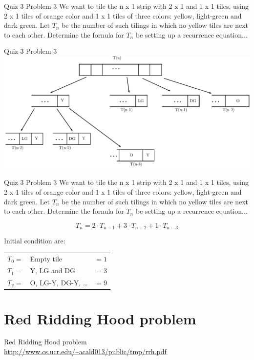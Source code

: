 \documentclass{beamer}
\begin{document}
\begin{frame}{Quiz 3 Problem 3}
We want to tile the n x 1 strip with 2 x 1 and 1 x 1 tiles, using 2 x 1 tiles of orange color and 1 x 1 tiles of three colors: yellow, light-green and dark green.  Let $T_n$ be the number of such tilings in which no yellow tiles are next to each other.  Determine the fornula for $T_n$ be setting up a recurrence equation...
\end{frame}

\begin{frame}{Quiz 3 Problem 3}
    \centering
    \includegraphics[width=1\linewidth]{tiling}
\end{frame}

\begin{frame}{Quiz 3 Problem 3}
We want to tile the n x 1 strip with 2 x 1 and 1 x 1 tiles, using 2 x 1 tiles of orange color and 1 x 1 tiles of three colors: yellow, light-green and dark green.  Let $T_n$ be the number of such tilings in which no yellow tiles are next to each other.  Determine the fornula for $T_n$ be setting up a recurrence equation...

$$ T_n = 2 \cdot T_{n-1} + 3 \cdot T_{n-2} + 1 \cdot T_{n-3}$$

Initial condition are: \\
    \begin{tabular}{l l l}
        $T_0 = $ & Empty tile & $ = 1$ \\
        $T_1 = $ & Y, LG and DG  & $ = 3$ \\
        $T_2 = $ & O, LG-Y, DG-Y, \dots & $ = 9$ \\
    \end{tabular}
\end{frame}

\section{Red Ridding Hood problem}

\begin{frame}{Red Ridding Hood problem}
    \centering
    \url{http://www.cs.ucr.edu/~acald013/public/tmp/rrh.pdf}
\end{frame}
\end{document}
